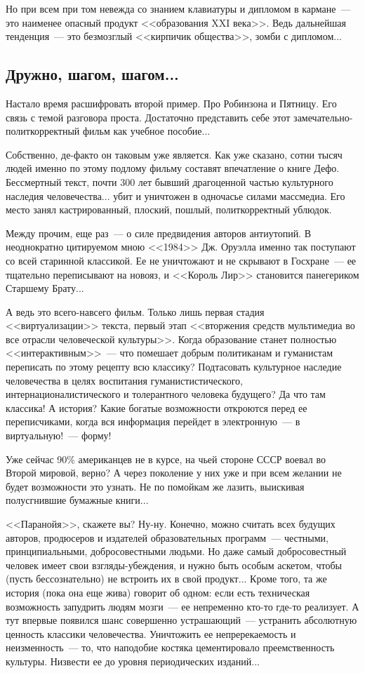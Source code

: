 \documentclass{scrbook}
\newcommand{\flqq}{<<}
\newcommand{\frqq}{>>}
\newcommand{\mdash}{~--- }
\newcommand{\essaysection}[1]{\subsection*{#1}\nopagebreak}
\begin{document}
Но при всем при том невежда со знанием клавиатуры и дипломом в кармане{\mdash}это наименее опасный продукт {\flqq}образования XXI века{\frqq}. Ведь дальнейшая тенденция{\mdash}это безмозглый {\flqq}кирпичик общества{\frqq}, зомби с дипломом...

\essaysection{Дружно, шагом, шагом...}

Настало время расшифровать второй пример. Про Робинзона и Пятницу. Его связь с темой разговора проста. Достаточно представить себе этот замечательно-политкорректный фильм как учебное пособие...

Собственно, де-факто он таковым уже является. Как уже сказано, сотни тысяч людей именно по этому подлому фильму составят впечатление о книге Дефо. Бессмертный текст, почти 300 лет бывший драгоценной частью культурного наследия человечества... убит и уничтожен в одночасье силами массмедиа. Его место занял кастрированный, плоский, пошлый, политкорректный ублюдок.

Между прочим, еще раз{\mdash}о силе предвидения авторов антиутопий. В неоднократно цитируемом мною {\flqq}1984{\frqq} Дж. Оруэлла именно так поступают со всей старинной классикой. Ее не уничтожают и не скрывают в Госхране{\mdash}ее тщательно переписывают на новояз, и {\flqq}Король Лир{\frqq} становится панегериком Старшему Брату...

А ведь это всего-навсего фильм. Только лишь первая стадия {\flqq}виртуализации{\frqq} текста, первый этап {\flqq}вторжения средств мультимедиа во все отрасли человеческой культуры{\frqq}. Когда образование станет полностью {\flqq}интерактивным{\frqq}{\mdash}что помешает добрым политиканам и гуманистам переписать по этому рецепту всю классику? Подтасовать культурное наследие человечества в целях воспитания гуманистистического, интернационалистического и толерантного человека будущего? Да что там классика! А история? Какие богатые возможности откроются перед ее переписчиками, когда вся информация перейдет в электронную{\mdash}в виртуальную!{\mdash}форму!

Уже сейчас 90\% американцев не в курсе, на чьей стороне СССР воевал во Второй мировой, верно? А через поколение у них уже и при всем желании не будет возможности это узнать. Не по помойкам же лазить, выискивая полусгнившие бумажные книги...

{\flqq}Паранойя{\frqq}, скажете вы? Ну-ну. Конечно, можно считать всех будущих авторов, продюсеров и издателей образовательных программ{\mdash}честными, принципиальными, добросовестными людьми. Но даже самый добросовестный человек имеет свои взгляды-убеждения, и нужно быть особым аскетом, чтобы (пусть бессознательно) не встроить их в свой продукт... Кроме того, та же история (пока она еще жива) говорит об одном: если есть техническая возможность запудрить людям мозги{\mdash}ее непременно кто-то где-то реализует. А тут впервые появился шанс совершенно устрашающий{\mdash}устранить абсолютную ценность классики человечества. Уничтожить ее непререкаемость и неизменность{\mdash}то, что наподобие костяка цементировало преемственность культуры. Низвести ее до уровня периодических изданий...
\end{document}
